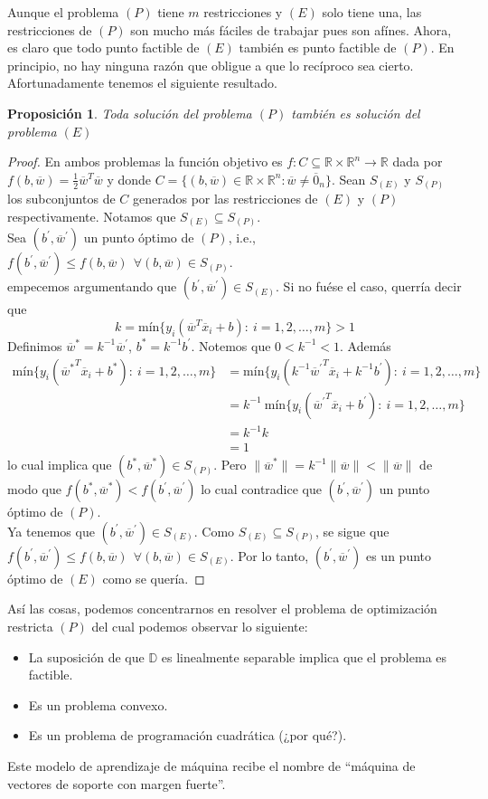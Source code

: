 \documentclass[11pt]{article}
\newtheorem{proposition}{Proposición}[section]
\newcommand{\R}{\mathbb{R}}
\newcommand{\Rn}{\R^{n}}
\newcommand{\Rnu}{\R\times\Rn}
\newcommand{\wv}{\overline{w}}
\newcommand{\x}{\overline{x}}
\newcommand{\z}{\overline{0}_{n}}
\newcommand{\Sm}{1,2,\ldots, m}
\newcommand{\bo}{b^{*}}
\newcommand{\bc}{b^{'}}
\newcommand{\wo}{\wv^{*}}
\newcommand{\wc}{\wv^{'}}
\newcommand{\Dat}{\mathbb{D}}
\newcommand{\nw}{\|\wv\|}
\newcommand{\SE}{S_{(E)}}
\newcommand{\SP}{S_{(P)}}
\begin{document}
Aunque el problema $(P)$ tiene $m$ restricciones y $(E)$ solo tiene una, las restricciones de $(P)$ son mucho más fáciles de trabajar pues son afínes. Ahora, es claro que todo punto factible de $(E)$ también es punto factible de $(P)$. En principio, no hay ninguna razón que obligue a que lo recíproco sea cierto. Afortunadamente tenemos el siguiente resultado.

\begin{proposition}
Toda solución del problema $(P)$ también es solución del problema $(E)$
\end{proposition}
\begin{proof}
En ambos problemas la función objetivo es $f:C\subseteq\Rnu\rightarrow\R$ dada por $f(b, \wv)=\frac{1}{2}\wv^{T}\wv$ y donde $C=\{(b,\wv)\in\Rnu: \wv\ne\z\}$. Sean $\SE$ y $\SP$ los subconjuntos de $C$ generados por las restricciones de $(E)$ y $(P)$ respectivamente. Notamos que $\SE\subseteq\SP$.\\
Sea $(\bc,\wc)$ un punto óptimo de $(P)$, i.e., $f(\bc, \wc)\leq f(b, \wv)\ \ \forall(b, \wv)\in\SP$.\\
empecemos argumentando que $(\bc, \wc)\in\SE$. Si no fuése el caso, querría decir que
$$k=\text{mín}\{y_{i}(\wv^{T}\x_{i}+b):\ i=\Sm \}>1$$
Definimos $\wo=k^{-1}\wc$, $\bo=k^{-1}\bc$. Notemos que $0<k^{-1}<1$. Además
\begin{equation*}
\begin{aligned}
\text{mín}\{y_{i}({\wo}^{T}\x_{i}+\bo):\ i=\Sm \}&=\text{mín}\{y_{i}(k^{-1}{\wc}^{T}\x_{i}+k^{-1}{\bc}):\ i=\Sm \}\\
&=k^{-1}\ \text{mín}\{y_{i}({\wc}^{T}\x_{i}+{\bc}):\ i=\Sm \}\\
&=k^{-1}k\\
&=1
\end{aligned}
\end{equation*}
lo cual implica que $(\bo, \wo)\in\SP$. Pero $\|\wo \|=k^{-1}\nw<\nw$ de modo que $f(\bo, \wo)<f(\bc, \wc)$ lo cual contradice que $(\bc,\wc)$ un punto óptimo de $(P)$.\\
Ya tenemos que $(\bc,\wc)\in\SE$. Como $\SE\subseteq\SP$, se sigue que $f(\bc, \wc)\leq f(b, \wv)\ \ \forall(b, \wv)\in\SE$. Por lo tanto, $(\bc,\wc)$ es un punto óptimo de $(E)$ como se quería.
\end{proof}
Así las cosas, podemos concentrarnos en resolver el problema de optimización restricta $(P)$ del cual podemos observar lo siguiente:
\begin{itemize}
\item La suposición de que $\Dat$ es linealmente separable implica que el problema es factible.
\item Es un problema convexo.
\item Es un problema de programación cuadrática (¿por qué?).
\end{itemize}
Este modelo de aprendizaje de máquina recibe el nombre de ``máquina de vectores de soporte con margen fuerte''.\\
\end{document}
